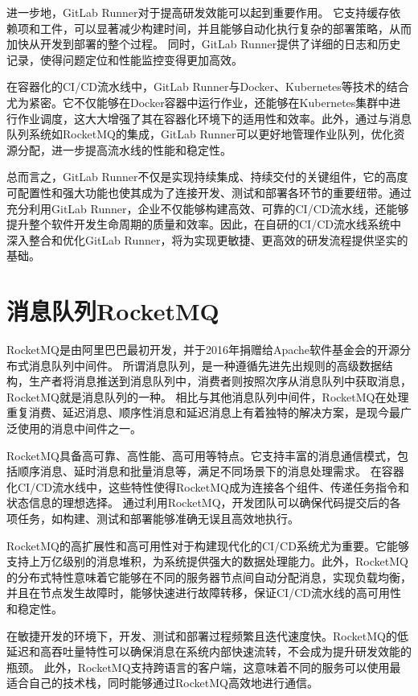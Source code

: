 进一步地，GitLab Runner对于提高研发效能可以起到重要作用。
它支持缓存依赖项和工件，可以显著减少构建时间，并且能够自动化执行复杂的部署策略，从而加快从开发到部署的整个过程。
同时，GitLab Runner提供了详细的日志和历史记录，使得问题定位和性能监控变得更加高效\cite{vassallo2020configuration}。

在容器化的CI/CD流水线中，GitLab Runner与Docker、Kubernetes等技术的结合尤为紧密。它不仅能够在Docker容器中运行作业，还能够在Kubernetes集群中进行作业调度，这大大增强了其在容器化环境下的适用性和效率。此外，通过与消息队列系统如RocketMQ的集成，GitLab Runner可以更好地管理作业队列，优化资源分配，进一步提高流水线的性能和稳定性。

总而言之，GitLab Runner不仅是实现持续集成、持续交付的关键组件，它的高度可配置性和强大功能也使其成为了连接开发、测试和部署各环节的重要纽带。通过充分利用GitLab Runner，企业不仅能够构建高效、可靠的CI/CD流水线，还能够提升整个软件开发生命周期的质量和效率。因此，在自研的CI/CD流水线系统中深入整合和优化GitLab Runner，将为实现更敏捷、更高效的研发流程提供坚实的基础。


\section{消息队列RocketMQ}
RocketMQ是由阿里巴巴最初开发，并于2016年捐赠给Apache软件基金会的开源分布式消息队列中间件。
所谓消息队列，是一种遵循先进先出规则的高级数据结构，生产者将消息推送到消息队列中，消费者则按照次序从消息队列中获取消息，RocketMQ就是消息队列的一种。
相比与其他消息队列中间件，RocketMQ在处理重复消费、延迟消息、顺序性消息和延迟消息上有着独特的解决方案，是现今最广泛使用的消息中间件之一\cite{分布式消息系统研究综述}。

RocketMQ具备高可靠、高性能、高可用等特点。它支持丰富的消息通信模式，包括顺序消息、延时消息和批量消息等，满足不同场景下的消息处理需求\cite{RJSJ201811013}。
在容器化CI/CD流水线中，这些特性使得RocketMQ成为连接各个组件、传递任务指令和状态信息的理想选择\cite{1023416528.nh}。
通过利用RocketMQ，开发团队可以确保代码提交后的各项任务，如构建、测试和部署能够准确无误且高效地执行。

RocketMQ的高扩展性和高可用性对于构建现代化的CI/CD系统尤为重要。它能够支持上万亿级别的消息堆积，为系统提供强大的数据处理能力。此外，RocketMQ的分布式特性意味着它能够在不同的服务器节点间自动分配消息，实现负载均衡，并且在节点发生故障时，能够快速进行故障转移，保证CI/CD流水线的高可用性和稳定性。

在敏捷开发的环境下，开发、测试和部署过程频繁且迭代速度快。RocketMQ的低延迟和高吞吐量特性可以确保消息在系统内部快速流转，不会成为提升研发效能的瓶颈。
此外，RocketMQ支持跨语言的客户端，这意味着不同的服务可以使用最适合自己的技术栈，同时能够通过RocketMQ高效地进行通信。

